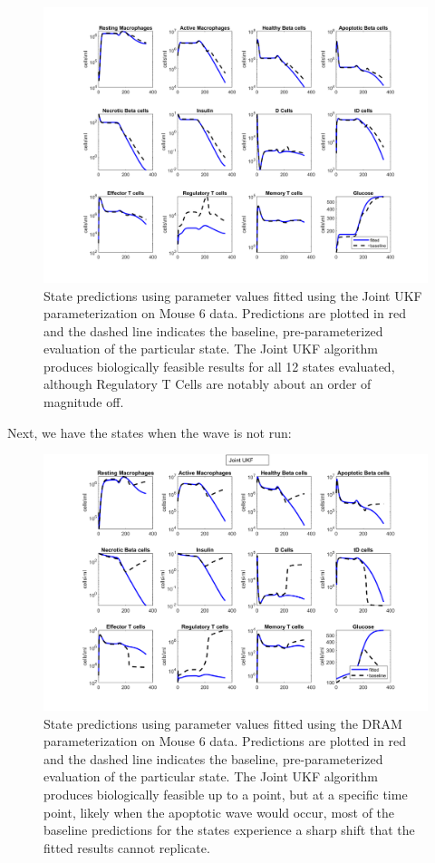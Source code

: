 \begin{appendices}
\begin{figure}[H] 
    \centering
    \includegraphics[width=15cm]{Kalman_Filter_Images/Joint_mouse6_allstates.png}
    \caption{State predictions using parameter values fitted using the Joint UKF parameterization on Mouse 6 data. Predictions are plotted in red and the dashed line indicates the baseline, pre-parameterized evaluation of the particular state. The Joint UKF algorithm produces biologically feasible results for all 12 states evaluated, although Regulatory T Cells are notably about an order of magnitude off.}
    \label{fig:ukf_biocheck1}
\end{figure}
Next, we have the states when the wave is not run:
\begin{figure}[H] 
    \centering
    \includegraphics[width=15cm]{Kalman_Filter_Images/Joint_mouse6_allstates_nowave.png}
    \caption{State predictions using parameter values fitted using the DRAM parameterization on Mouse 6 data. Predictions are plotted in red and the dashed line indicates the baseline, pre-parameterized evaluation of the particular state. The Joint UKF algorithm produces biologically feasible up to a point, but at a specific time point, likely when the apoptotic wave would occur, most of the baseline predictions for the states experience a sharp shift that the fitted results cannot replicate.}
    \label{fig:ukf_biocheck2}
\end{figure}


\end{appendices}
